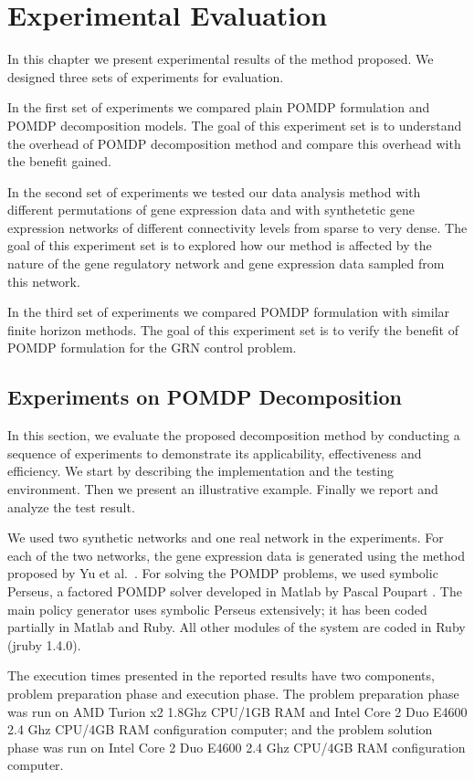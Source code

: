 \chapter{Experimental Evaluation}
\label{chapter:experiments}

In this chapter we present experimental results of the method proposed. We designed three sets of experiments for evaluation. 

In the first set of experiments we compared plain POMDP formulation and POMDP decomposition models. The goal of this experiment set is to understand the overhead of POMDP decomposition method and compare this overhead with the benefit gained.

In the second set of experiments we tested our data analysis method with different permutations of gene expression data and with synthetetic gene expression networks of different connectivity levels from sparse to very dense. The goal of this experiment set is to explored how our method is affected by the nature of the gene regulatory network and gene expression data sampled from this network. 

In the third set of experiments we compared POMDP formulation with similar finite horizon methods. The goal of this experiment set is to verify the benefit of POMDP formulation for the GRN control problem.

\section{Experiments on POMDP Decomposition}\label{exp-res}

In this section, we evaluate the proposed decomposition method by conducting a sequence of experiments to demonstrate its
applicability, effectiveness and efficiency. We start by describing the implementation and the testing
environment. Then we present an illustrative example. Finally we report and analyze the test result.

We used two synthetic networks and one real network in the experiments. For each of the two networks, the
gene expression data is generated using the method proposed by Yu et al.~\cite{Yu02}. For solving the POMDP
problems, we used symbolic Perseus, a factored POMDP solver developed in Matlab by Pascal Poupart
\cite{Poupart05}. The main policy generator uses symbolic Perseus extensively; it has been coded partially in
Matlab and Ruby. All other modules of the system are coded in Ruby (jruby 1.4.0).

The execution times presented in the reported results have two components, problem preparation phase and
execution phase. The problem preparation phase was run on AMD Turion x2 1.8Ghz CPU/1GB RAM and Intel Core 2
Duo E4600 2.4 Ghz CPU/4GB RAM configuration computer; and the problem solution phase was run on Intel Core 2
Duo E4600 2.4 Ghz CPU/4GB RAM configuration computer.

